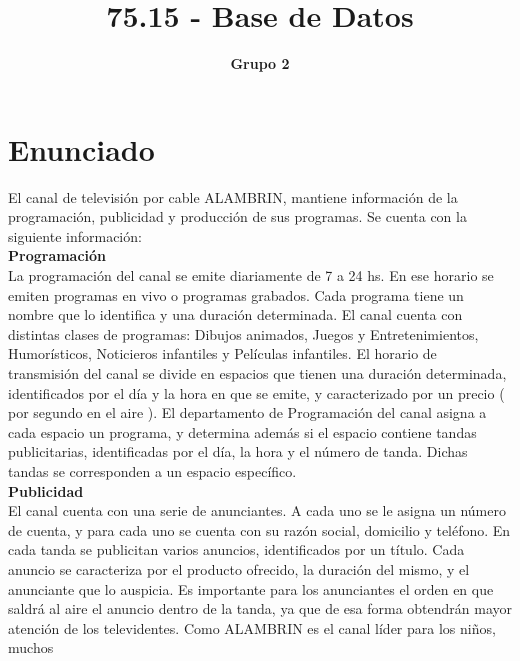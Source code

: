 \documentclass[a4paper,10pt,titlepage]{article}
\title{75.15 - Base de Datos}
\author{\textbf{Grupo 2}}
\begin{document}
\pagestyle{fancy}
\maketitle

\tableofcontents
\newpage

\section{Enunciado}
El canal de televisi\'on por cable ALAMBRIN, mantiene informaci\'on de la programaci\'on, publicidad y producci\'on
de sus programas. Se cuenta con la siguiente informaci\'on:
\\ \textbf{Programaci\'on} \\
La programaci\'on del canal se emite diariamente de 7 a 24 hs. En ese horario se emiten programas en vivo o
programas grabados. Cada programa tiene un nombre que lo identifica y una duraci\'on determinada. El canal
cuenta con distintas clases de programas: Dibujos animados, Juegos y Entretenimientos, Humorísticos,
Noticieros infantiles y Películas infantiles.
El horario de transmisi\'on del canal se divide en espacios que tienen una duraci\'on determinada, identificados por
el día y la hora en que se emite, y caracterizado por un precio ( por segundo en el aire ).
El departamento de Programaci\'on del canal asigna a cada espacio un programa, y determina adem\'as si el
espacio contiene tandas publicitarias, identificadas por el día, la hora y el n\'umero de tanda. Dichas tandas se
corresponden a un espacio específico.
\\ \textbf{Publicidad}\\
El canal cuenta con una serie de anunciantes. A cada uno se le asigna un n\'umero de cuenta, y para cada uno se
cuenta con su raz\'on social, domicilio y tel\'efono.
En cada tanda se publicitan varios anuncios, identificados por un título. Cada anuncio se caracteriza por el
producto ofrecido, la duraci\'on del mismo, y el anunciante que lo auspicia.
Es importante para los anunciantes el orden en que saldr\'a al aire el anuncio dentro de la tanda, ya que de esa
forma obtendr\'an mayor atenci\'on de los televidentes. Como ALAMBRIN es el canal líder para los niños, muchos
\end{document}
